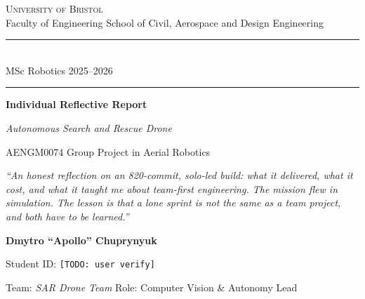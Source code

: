 
\begin{titlepage}
  \centering
  \thispagestyle{empty}

  \vspace*{0.4cm}
  {\large\scshape University of Bristol}\\[2pt]
  {\small Faculty of Engineering \textbar{} School of Civil, Aerospace and Design Engineering}
  \vspace{0.5cm}

  \rule{0.55\textwidth}{0.6pt}\\[0.15cm]
  {\footnotesize MSc Robotics \textbar{} 2025--2026}\\[0.1cm]
  \rule{0.55\textwidth}{0.6pt}

  \vspace{1.4cm}

  {\Huge\bfseries\color{headblue} Individual Reflective Report\par}
  \vspace{0.35cm}
  {\LARGE\itshape Autonomous Search and Rescue Drone\par}
  \vspace{0.9cm}
  {\large AENGM0074 \textemdash{} Group Project in Aerial Robotics\par}

  \vspace{1.6cm}

  \begin{minipage}{0.78\textwidth}
    \centering\itshape\small
    ``An honest reflection on an 820-commit, solo-led build: what it delivered,
    what it cost, and what it taught me about team-first engineering.
    The mission flew in simulation. The lesson is that a lone sprint is not
    the same as a team project, and both have to be learned.''
  \end{minipage}

  \vspace{1.6cm}

  {\large\bfseries Dmytro ``Apollo'' Chuprynyuk\par}
  \vspace{0.15cm}
  {\normalsize Student ID: \texttt{[TODO: user verify]}\par}
  \vspace{0.15cm}
  {\normalsize Team: \textit{SAR Drone Team} \textbar{} Role: Computer Vision \& Autonomy Lead\par}


\end{titlepage}

